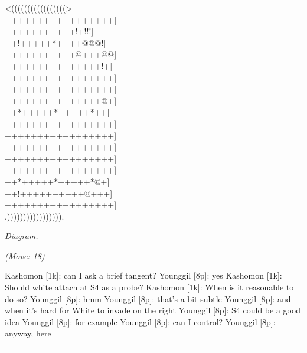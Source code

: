 \documentclass[letterpaper,12pt]{memoir}
\newcounter{GoFigure}[part]
\newcommand{\gofigure}{%
 \stepcounter{GoFigure}
 \centerline{\textit{Diagram.\thinspace\arabic{GoFigure}}}
}
\newcommand{\subtext}[1]{\centerline{\textit{#1}}}
\begin{document}
\begin{minipage}[t]{0.5\textwidth}
{\gnos
<(((((((((((((((((>\\
+++++++++++++++++]\\
+++++++++++!+!!!]\\
++!+++++*++++@@@!]\\
+++++++++++@+++@@]\\
+++++++++++++++!+]\\
+++++++++++++++++]\\
+++++++++++++++++]\\
+++++++++++++++@+]\\
++*+++++*+++++*++]\\
+++++++++++++++++]\\
+++++++++++++++++]\\
+++++++++++++++++]\\
+++++++++++++++++]\\
+++++++++++++++++]\\
++*+++++*+++++*@+]\\
++!++++++++++@+++]\\
+++++++++++++++++]\\
,))))))))))))))))).\\
}
\gofigure

\subtext{(Move: 18)}
\end{minipage}
\begin{minipage}[t]{0.5\textwidth}
\setlength{\parskip}{0.5em}
Kashomon [1k]: can I ask a brief tangent?
Younggil [8p]: yes
Kashomon [1k]: Should white attach at S4 as a probe?
Kashomon [1k]: When is it reasonable to do so?
Younggil [8p]: hmm
Younggil [8p]: that's a bit subtle
Younggil [8p]: and when it's hard for White to invade on the right
Younggil [8p]: S4 could be a good idea
Younggil [8p]: for example
Younggil [8p]: can I control?
Younggil [8p]: anyway, here


\end{minipage}
\vfill

\rule{\textwidth}{0.5pt}
\end{document}
